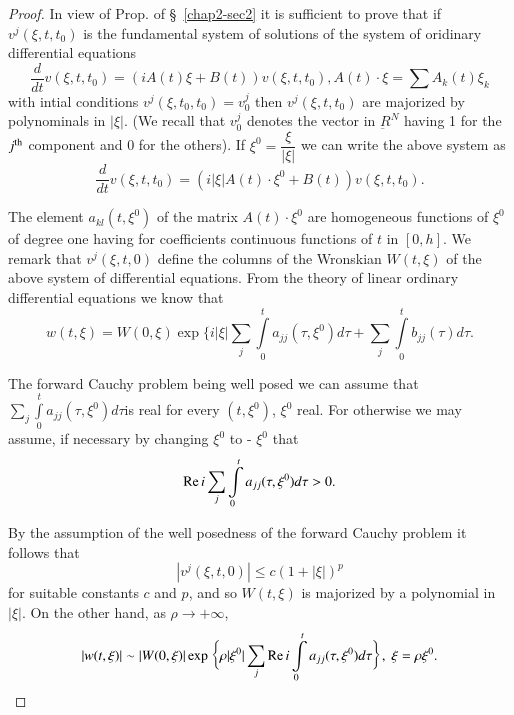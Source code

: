\begin{proof}
In view of Prop. \label{chap2-sec3-prop3} of \S\ \ref{chap2-sec2} it
is sufficient to prove that if 
$v^j(\xi, t, t_0)$ is the fundamental system of solutions of the
system of oridinary differential equations 
\begin{equation}
\frac{d}{dt} v (\xi,  t, t_0) = (iA(t) \xi + B (t)) v (\xi,  t, t_0),
A(t) \cdot \xi = \sum A_k (t) \xi_k \tag{4.1}\label{chap2-eq4.1}  
 \end{equation} 
with intial conditions $v^j(\xi,  t_0, t_0) = v^j_0$ then $v^j(\xi,
t, t_0)$ are majorized by polynominals in $|\xi|$. (We recall that
$v^j_0$ denotes the vector in $\underbar{R}^N$  having 1 for the
$j^{\rm th}$ component and 0 for the others). If $\xi^0 =
\dfrac{\xi}{|\xi |}$ we can write the above system as 
\begin{equation}
\frac{d}{dt} v (\xi, t, t_0) = (i|\xi | A (t) \cdot  \xi^0 + B (t)) v (\xi,
t, t_0). \tag{$4.1'$} 
\end{equation}  

The element $a_{kl}(t, \xi^0)$ of the matrix $A(t) \cdot \xi^0$ are
homogeneous functions of $\xi^0$ of degree one having for coefficients
continuous functions of $t$ in $[0, h]$. We remark that $v^j(\xi, t,
0)$ define the columns of the Wronskian $W(t, \xi)$ of the above system
of differential equations. From the theory of  linear ordinary
differential equations we know that  
\begin{equation}
w (t, \xi ) = W(0, \xi ) \exp \bigg\{i |\xi | \sum\limits_j
\int\limits^{t}_{0} a_{jj} (\tau, \xi^0 )d\tau + \sum\limits_j
\int\limits^t_{0} b_{jj} (\tau) d \tau. \tag{4.2}\label{chap2-eq4.2} 
\end{equation}

The forward Cauchy problem being well posed we can assume that
$\sum\limits_{j} \int\limits^{t}_{0} a_{jj} (\tau,  \xi^0) d \tau
$\pageoriginale is 
real for every $(t, \xi^0)$, $\xi^0$ real. For otherwise we may
assume, if necessary by changing $\xi^0$ to - $\xi^0$ that  
$$
\operatorname{Re} i \sum\limits_{j}\int\limits^{t}_{0} a_{jj} (\tau, \xi ^0) d\tau > 
0. 
$$ 

By the assumption of the well posedness of the forward Cauchy problem 
it follows that  
\begin{equation}
| v^j (\xi,  t, 0)| \leq c (1+|\xi|)^p \tag{4.3}\label{chap2-eq4.3} 
\end{equation}
for suitable constants $c$ and $p$, and so $W(t, \xi)$ is majorized
by a polynomial in $|\xi|$. On the other hand, as $\rho \to +
\infty$,  
$$
|w (t, \xi) | \sim |W(0, \xi)| \exp \bigg\{\rho |\xi^0 | \sum\limits_j
\operatorname{Re} i \int\limits^{t}_{0} a_{jj} (\tau,  \xi^0)d \tau \bigg\}, \; 
\xi=\rho \xi^0. 
$$


\end{proof}
